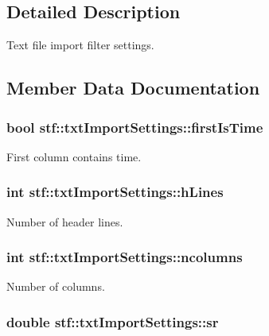 \subsection{Detailed Description}
Text file import filter settings. 

\subsection{Member Data Documentation}
\hypertarget{structstf_1_1txtImportSettings_af7123ba3b1732914e1f3009fc0ccb888}{
\subsubsection[{firstIsTime}]{\setlength{\rightskip}{0pt plus 5cm}bool {\bf stf::txtImportSettings::firstIsTime}}}
\label{structstf_1_1txtImportSettings_af7123ba3b1732914e1f3009fc0ccb888}
First column contains time. \hypertarget{structstf_1_1txtImportSettings_a7356008be84b96781c8dd98dac0c3dea}{
\subsubsection[{hLines}]{\setlength{\rightskip}{0pt plus 5cm}int {\bf stf::txtImportSettings::hLines}}}
\label{structstf_1_1txtImportSettings_a7356008be84b96781c8dd98dac0c3dea}
Number of header lines. \hypertarget{structstf_1_1txtImportSettings_a7240de5e36d202c93f61ef4480dc3ae1}{
\subsubsection[{ncolumns}]{\setlength{\rightskip}{0pt plus 5cm}int {\bf stf::txtImportSettings::ncolumns}}}
\label{structstf_1_1txtImportSettings_a7240de5e36d202c93f61ef4480dc3ae1}
Number of columns. \hypertarget{structstf_1_1txtImportSettings_a33e95b58e6cb81cd96c84ae89445f9be}{
\subsubsection[{sr}]{\setlength{\rightskip}{0pt plus 5cm}double {\bf stf::txtImportSettings::sr}}}
